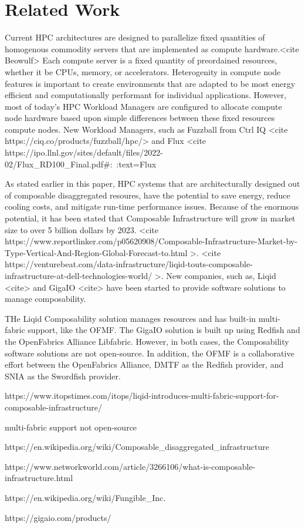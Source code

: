 \section{Related Work}
Current HPC architectures are designed to parallelize fixed quantities of homogenous commodity servers that are implemented as compute hardware.<cite Beowulf>  Each compute server is a fixed quantity of preordained resources, whether it be CPUs, memory, or accelerators.  Heterogenity in compute node features is important to create environments that are adapted to be most energy efficient and computationally performant for individual applications.  However, most of today's HPC Workload Managers are configured to allocate compute node hardware based upon simple differences between these fixed resources compute nodes.  New Workload Managers, such as Fuzzball from Ctrl IQ <cite https://ciq.co/products/fuzzball/hpc/> and Flux <cite https://ipo.llnl.gov/sites/default/files/2022-02/Flux_RD100_Final.pdf#:~:text=Flux%
 
As stated earlier in this paper, HPC systems that are architecturally designed out of composable disaggregated resoures, have the potential to save energy, reduce cooling costs, and mitigate run-time performance issues.  Because of the enormous potential, it has been stated that Composable Infrastructure will grow in market size to over 5 billion dollars by 2023. <cite https://www.reportlinker.com/p05620908/Composable-Infrastructure-Market-by-Type-Vertical-And-Region-Global-Forecast-to.html >. <cite https://venturebeat.com/data-infrastructure/liqid-touts-composable-infrastructure-at-dell-technologies-world/ >. New companies, such as, Liqid <cite> and GigaIO <cite> have been started to provide software solutions to manage composability.  

THe Liqid Composability solution manages resources and has built-in multi-fabric support, like the OFMF.  The GigaIO solution is built up using Redfish and the OpenFabrics Alliance Libfabric.  However, in both cases, the Composability software solutions are not open-source.  In addition, the OFMF is a collaborative effort between the OpenFabrics Alliance, DMTF as the Redfish provider, and SNIA as the Swordfish provider.

https://www.itopstimes.com/itops/liqid-introduces-multi-fabric-support-for-composable-infrastructure/

multi-fabric support not open-source

https://en.wikipedia.org/wiki/Composable_disaggregated_infrastructure

https://www.networkworld.com/article/3266106/what-is-composable-infrastructure.html

https://en.wikipedia.org/wiki/Fungible_Inc.

https://gigaio.com/products/




 
